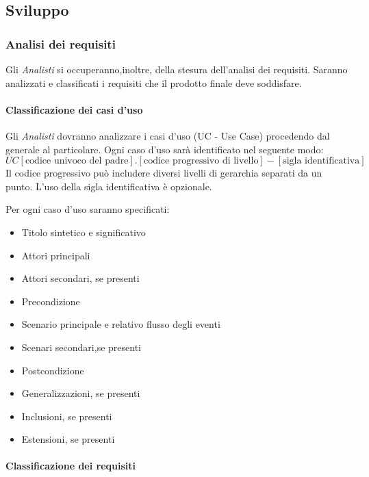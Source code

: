 \subsection{Sviluppo}

\subsubsection{Analisi dei requisiti}

Gli \emph{Analisti} si occuperanno,inoltre, della stesura dell'analisi dei
requisiti. Saranno analizzati e classificati i requisiti che il
prodotto finale deve soddisfare.


\paragraph{Classificazione dei casi d'uso} 

Gli \emph{Analisti} dovranno analizzare i
casi d'uso (UC - Use Case) procedendo dal generale al particolare. Ogni
caso d'uso sarà identificato nel seguente modo: 
$$ UC[\text{codice univoco del padre}].[\text{codice progressivo di livello}]-[\text{sigla identificativa}] $$ 
Il codice progressivo può includere diversi livelli di gerarchia
separati da un punto. L'uso della sigla identificativa è
opzionale.

Per ogni caso d'uso saranno specificati:

\begin{itemize}
\item Titolo sintetico e significativo
\item Attori principali
\item Attori secondari, se presenti
\item Precondizione
\item Scenario principale e relativo flusso degli eventi
\item Scenari secondari,se presenti
\item Postcondizione
\item Generalizzazioni, se presenti
\item Inclusioni, se presenti
\item Estensioni, se presenti
\end{itemize}


\paragraph{Classificazione dei requisiti}

